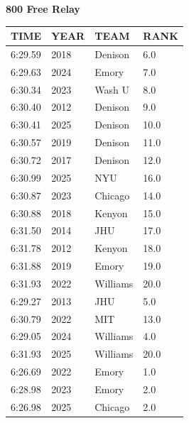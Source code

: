 \begin{table}[H]
\centering
\begin{minipage}[t]{0.6\textwidth}
\centering
\textbf{800 Free Relay}\\[0.1cm]
\begin{tabular}{@{}p{1.8cm}p{1.2cm}p{1.4cm}p{0.8cm}@{}}
\hline
    \textbf{TIME} & \textbf{YEAR} & \textbf{TEAM} & \textbf{RANK} \\
\hline
    6:29.59 & 2018 & Denison & 6.0 \\
    6:29.63 & 2024 & Emory & 7.0 \\
    6:30.34 & 2023 & Wash U & 8.0 \\
    6:30.40 & 2012 & Denison & 9.0 \\
    6:30.41 & 2025 & Denison & 10.0 \\
    6:30.57 & 2019 & Denison & 11.0 \\
    6:30.72 & 2017 & Denison & 12.0 \\
    6:30.99 & 2025 & NYU & 16.0 \\
    6:30.87 & 2023 & Chicago & 14.0 \\
    6:30.88 & 2018 & Kenyon & 15.0 \\
    6:31.50 & 2014 & JHU & 17.0 \\
    6:31.78 & 2012 & Kenyon & 18.0 \\
    6:31.88 & 2019 & Emory & 19.0 \\
    6:31.93 & 2022 & Williams & 20.0 \\
    6:29.27 & 2013 & JHU & 5.0 \\
    6:30.79 & 2022 & MIT & 13.0 \\
    6:29.05 & 2024 & Williams & 4.0 \\
    6:31.93 & 2025 & Williams & 20.0 \\
    6:26.69 & 2022 & Emory & 1.0 \\
    6:28.98 & 2023 & Emory & 2.0 \\
    6:26.98 & 2025 & Chicago & 2.0 \\
\hline
\end{tabular}
\end{minipage}
\end{table}

